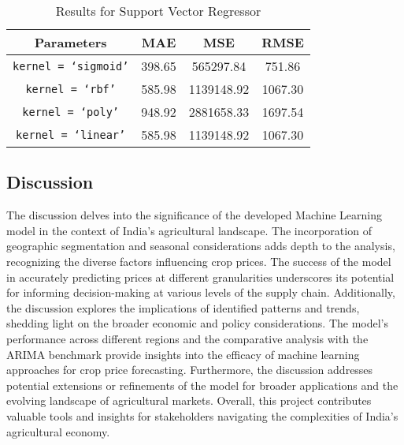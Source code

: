         \begin{table}[H]
            \centering
            \setlength\tabcolsep{3 mm}
            \begin{tabular}{c c c c}
                \toprule
                Parameters & MAE & MSE & RMSE\\
                \toprule
                \texttt{kernel = `sigmoid'} & 398.65 & 565297.84 & 751.86\\
                \texttt{kernel = `rbf'} & 585.98 & 1139148.92 & 1067.30\\
                \texttt{kernel = `poly'} & 948.92 & 2881658.33 & 1697.54\\
                \texttt{kernel = `linear'} & 585.98 & 1139148.92 & 1067.30\\
                \bottomrule
            \end{tabular}
            \caption{Results for Support Vector Regressor}
            \label{tab:my_label}
        \end{table}
        

    \subsection{Discussion}
        The discussion delves into the significance of the developed Machine Learning model in the context of India's agricultural landscape. The incorporation of geographic segmentation and seasonal considerations adds depth to the analysis, recognizing the diverse factors influencing crop prices. The success of the model in accurately predicting prices at different granularities underscores its potential for informing decision-making at various levels of the supply chain. Additionally, the discussion explores the implications of identified patterns and trends, shedding light on the broader economic and policy considerations. The model's performance across different regions and the comparative analysis with the ARIMA benchmark provide insights into the efficacy of machine learning approaches for crop price forecasting. Furthermore, the discussion addresses potential extensions or refinements of the model for broader applications and the evolving landscape of agricultural markets. Overall, this project contributes valuable tools and insights for stakeholders navigating the complexities of India's agricultural economy.